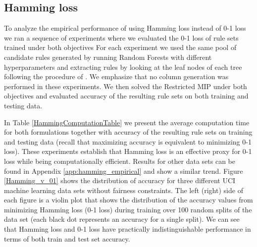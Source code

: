 \documentclass[twoside,11pt]{article}
\begin{document}
\subsection{Hamming loss}\label{sec:HammingEmp}
    To analyze the empirical performance of using Hamming loss instead of 0-1 loss we ran a sequence of experiments where we evaluated the 0-1 loss of rule sets trained under both objectives For each experiment we used the same pool of candidate rules generated by running Random Forests with different hyperparameters and extracting rules by looking at the leaf nodes of each tree following the procedure of \cite{birbil2020rule}. We emphasize that no column generation was performed in these experiments. We then solved the Restricted MIP under both objectives and evaluated accuracy of the resulting rule sets on both training and testing data. 
    
     
    
    
   In Table \ref{HammingComputationTable}  we present the average computation time for both formulations together with accuracy of the resulting rule sets on training and testing data  (recall that maximizing accuracy is equivalent to minimizing 0-1 loss).  These experiments establish that Hamming loss is an effective proxy for 0-1 loss while being computationally efficient. Results for other data sets can be found in Appendix \ref{app:hamming_empirical} and show a similar trend. Figure \ref{Hamming_v_01} shows the distribution of accuracy for three different UCI machine learning data sets without fairness constraints. The left (right) side of each figure is a violin plot that shows the distribution of the accuracy values from minimizing Hamming loss (0-1 loss) during training over 100 random splits of the data set (each black dot represents an accuracy for a single split). We can see that Hamming loss and 0-1 loss have practically indistinguishable performance in terms of both train and test set accuracy. 
\end{document}
